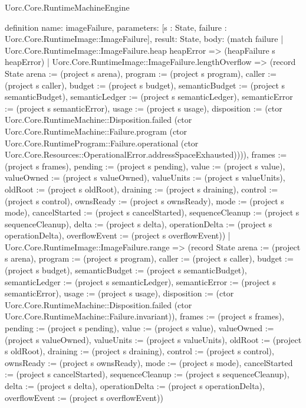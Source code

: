 \begin{lexlean}{Uorc.Core.RuntimeMachineEngine}
\begin{semanticmodule}
definition{
  name: imageFailure,
  parameters: [s : State, failure : Uorc.Core.RuntimeImage::ImageFailure],
  result: State,
  body: (match failure
    | Uorc.Core.RuntimeImage::ImageFailure.heap heapError => (heapFailure s heapError)
    | Uorc.Core.RuntimeImage::ImageFailure.lengthOverflow => (record State {arena := (project s arena), program := (project s program), caller := (project s caller), budget := (project s budget), semanticBudget := (project s semanticBudget), semanticLedger := (project s semanticLedger), semanticError := (project s semanticError), usage := (project s usage), disposition := (ctor Uorc.Core.RuntimeMachine::Disposition.failed (ctor Uorc.Core.RuntimeMachine::Failure.program (ctor Uorc.Core.RuntimeProgram::Failure.operational (ctor Uorc.Core.Resources::OperationalError.addressSpaceExhausted)))), frames := (project s frames), pending := (project s pending), value := (project s value), valueOwned := (project s valueOwned), valueUnits := (project s valueUnits), oldRoot := (project s oldRoot), draining := (project s draining), control := (project s control), ownsReady := (project s ownsReady), mode := (project s mode), cancelStarted := (project s cancelStarted), sequenceCleanup := (project s sequenceCleanup), delta := (project s delta), operationDelta := (project s operationDelta), overflowEvent := (project s overflowEvent)})
    | Uorc.Core.RuntimeImage::ImageFailure.range => (record State {arena := (project s arena), program := (project s program), caller := (project s caller), budget := (project s budget), semanticBudget := (project s semanticBudget), semanticLedger := (project s semanticLedger), semanticError := (project s semanticError), usage := (project s usage), disposition := (ctor Uorc.Core.RuntimeMachine::Disposition.failed (ctor Uorc.Core.RuntimeMachine::Failure.invariant)), frames := (project s frames), pending := (project s pending), value := (project s value), valueOwned := (project s valueOwned), valueUnits := (project s valueUnits), oldRoot := (project s oldRoot), draining := (project s draining), control := (project s control), ownsReady := (project s ownsReady), mode := (project s mode), cancelStarted := (project s cancelStarted), sequenceCleanup := (project s sequenceCleanup), delta := (project s delta), operationDelta := (project s operationDelta), overflowEvent := (project s overflowEvent)})
}
\end{semanticmodule}
\end{lexlean}
